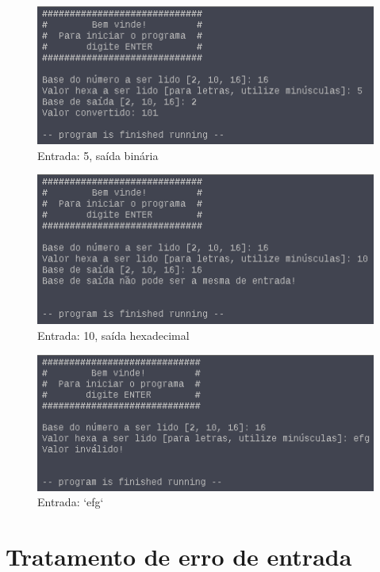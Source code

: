 \documentclass{article}
\begin{document}
\begin{figure}[H]
  \includegraphics[width=\linewidth]{./CasoHexa6}
  \caption{Entrada: 5, saída binária}
  \label{fig:hexa6}
\end{figure}

\begin{figure}[H]
  \includegraphics[width=\linewidth]{./CasoHexa7}
  \caption{Entrada: 10, saída hexadecimal}
  \label{fig:hexa7}
\end{figure}

\begin{figure}[H]
  \includegraphics[width=\linewidth]{./CasoHexa8}
  \caption{Entrada: `efg`}
  \label{fig:hexa8}
\end{figure}

\section{Tratamento de erro de entrada}
\end{document}
